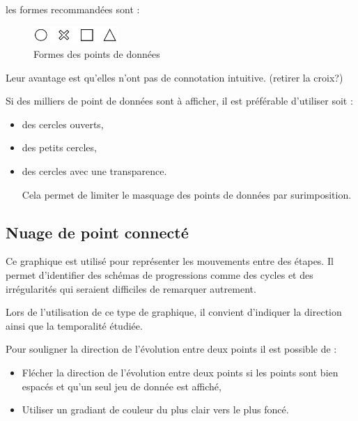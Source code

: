 \documentclass[a4paper,12pt]{article}
\begin{document}
\begin{multicols}{2}
les formes recommandées sont :

\begin{figure}[H]
\centering
\includegraphics[width=3.2cm]{./img/formes.pdf}
\caption{\label{fig:org2fe1422}Formes des points de données}
\end{figure}

Leur avantage est qu'elles n'ont pas de connotation intuitive.\autocite{andreaskrauseBestPracticesData2024} (retirer la croix?)

Si des milliers de point de données sont à afficher, il est préférable d'utiliser soit :
\begin{itemize}
\item des cercles ouverts,
\item des petits cercles,\autocite{stephenfewComponentlevelGraphDesign2012}
\item des cercles avec une transparence.\autocite{stephenfewComponentlevelGraphDesign2012}

Cela permet de limiter le masquage des points de données par surimposition. \autocite{andreaskrauseBestPracticesData2024}
\end{itemize}
\subsection*{Nuage de point connecté}
\label{sec:orgc8fea95}
Ce graphique est utilisé pour représenter les mouvements entre des étapes. Il permet d'identifier des schémas de progressions comme des cycles et des irrégularités qui seraient difficiles de remarquer autrement. \autocite{wilkeVisualizingTimeSeries2019}

Lors de l'utilisation de ce type de graphique, il convient d'indiquer la direction ainsi que la temporalité étudiée. \autocite{wilkeVisualizingTimeSeries2019}

Pour souligner la direction de l'évolution entre deux points il est possible de :
\begin{itemize}
\item Flécher la direction de l'évolution entre deux points si les points sont bien espacés et qu'un seul jeu de donnée est affiché, \autocite{jonathanschwabishComparingCategories2021}
\item Utiliser un gradiant de couleur du plus clair vers le plus foncé.\autocite{wilkeVisualizingTimeSeries2019}
\end{itemize}


\end{multicols}
\end{document}
